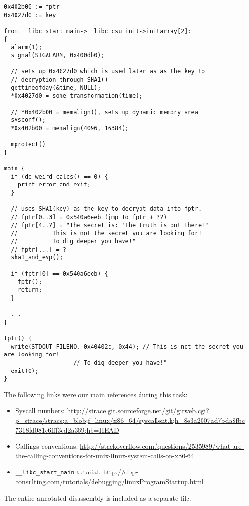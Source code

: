 \documentclass[a4paper,10pt]{article}
\begin{document}
\begin{lstlisting}
0x402b00 := fptr
0x4027d0 := key

from __libc_start_main->__libc_csu_init->initarray[2]:
{
  alarm(1);
  signal(SIGALARM, 0x400db0);

  // sets up 0x4027d0 which is used later as as the key to
  // decryption through SHA1()
  gettimeofday(&time, NULL);
  *0x4027d0 = some_transformation(time);

  // *0x402b00 = memalign(), sets up dynamic memory area
  sysconf();
  *0x402b00 = memalign(4096, 16384);

  mprotect()
}

main {
  if (do_weird_calcs() == 0) {
    print error and exit;
  }
  
  // uses SHA1(key) as the key to decrypt data into fptr.
  // fptr[0..3] = 0x540a6eeb (jmp to fptr + ??)
  // fptr[4..?] = "The secret is: "The truth is out there!"
  //		  This is not the secret you are looking for!
  //		  To dig deeper you have!"
  // fptr[...] = ?
  sha1_and_evp();

  if (fptr[0] == 0x540a6eeb) {
    fptr();
    return;
  }

  ...
}

fptr() {
  write(STDOUT_FILENO, 0x40402c, 0x44); // This is not the secret you are looking for!
					// To dig deeper you have!"
  exit(0);
}
\end{lstlisting}

The following links were our main references during this task:

\begin{itemize}
\item Syscall numbers: \url{http://strace.git.sourceforge.net/git/gitweb.cgi?p=strace/strace;a=blob;f=linux/x86_64/syscallent.h;h=8e3a2007ad7bda8fbc7318fd081c6fff3ed2a369;hb=HEAD}
\item Callings conventions: \url{http://stackoverflow.com/questions/2535989/what-are-the-calling-conventions-for-unix-linux-system-calls-on-x86-64}
\item \lstinline|__libc_start_main| tutorial: \url{http://dbp-consulting.com/tutorials/debugging/linuxProgramStartup.html}
\end{itemize}

The entire annotated disassembly is included as a separate file.
\end{document}
